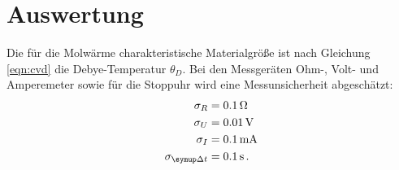\section{Auswertung}
\label{sec:Auswertung}
Die für die Molwärme charakteristische Materialgröße ist nach Gleichung \eqref{eqn:cvd} die Debye-Temperatur $\theta_D$. 
Bei den Messgeräten Ohm-, Volt- und Amperemeter sowie für die Stoppuhr wird eine Messunsicherheit abgeschätzt:
\begin{align*}
	\sigma_R &= \SI{0.1}{\ohm}\\
	\sigma_U &= \SI{0.01}{\volt}\\
	\sigma_I &= \SI{0.1}{\milli\ampere}\\
	\sigma_{\symup\Delta t} &= \SI{0.1}{\second}	\,\text.
\end{align*}
